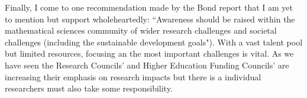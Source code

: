\documentclass[11pt]{article} %
\begin{document}
Finally, I come to one recommendation made by the Bond report \cite{Bond} that I am yet to mention but support wholeheartedly: ``Awareness should be raised within the mathematical sciences community of wider research challenges and societal challenges (including the sustainable development goals"). With a vast talent pool but limited resources, focusing an the most important challenges is vital. As we have seen the Research Councils' and Higher Education Funding Councils' are increasing their emphasis on research impacts but there is a individual researchers must also take some responsibility.
 
\pagebreak	
	
	
\end{document}
